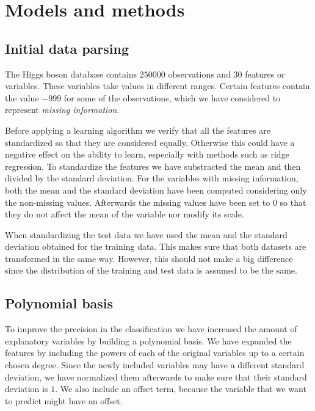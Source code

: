 \documentclass[10pt,conference,compsocconf]{IEEEtran}
\begin{document}
\section{Models and methods}
\label{sec:models-methods}
\subsection{Initial data parsing} %
\label{sub:initial_data_parsing}
  The Higgs boson database contains $250000$ observations and $30$ features or variables. These variables take values in different ranges. Certain features contain the value $-999$ for some of the observations, which we have considered to represent \emph{missing information}. %

  Before applying a learning algorithm we verify that all the features are standardized so that they are considered equally. Otherwise this could have a negative effect on the ability to learn, especially with methods such as ridge regression. To standardize the features we have substracted the mean and then divided by the standard deviation. For the variables with missing information, both the mean and the standard deviation have been computed considering only the non-missing values. Afterwards the missing values have been set to $0$ so that they do not affect the mean of the variable nor modify its scale.

  When standardizing the test data we have used the mean and the standard deviation obtained for the training data. This makes sure that both datasets are transformed in the same way. However, this should not make a big difference since the distribution of the training and test data is assumed to be the same.

\subsection{Polynomial basis} %
\label{sub:polynomial_basis}
  To improve the precision in the classification we have increased the amount of explanatory variables by building a polynomial basis. We have expanded the features by including the powers of each of the original variables up to a certain chosen degree. Since the newly included variables may have a different standard deviation, we have normalized them afterwards to make sure that their standard deviation is $1$. We also include an offset term, because the variable that we want to predict might have an offset.
\end{document}
